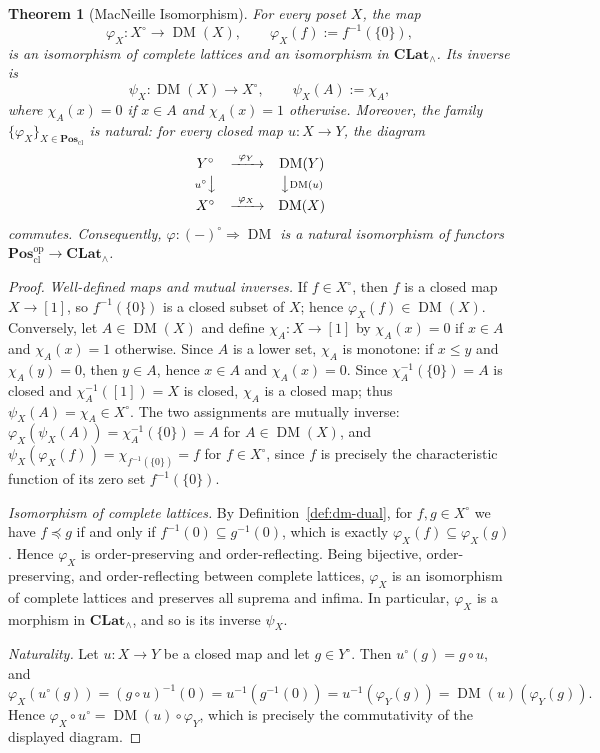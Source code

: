 \documentclass{amsart}
\theoremstyle{plain}
\newtheorem{theorem}{Theorem}[section]
\theoremstyle{definition}
\theoremstyle{remark}
\DeclareMathOperator{\DM}{DM}
\begin{document}
\begin{theorem}[MacNeille Isomorphism]\label{thm:macneille-iso}
For every poset $X$, the map
\[
\varphi_X\colon X^\circ\longrightarrow\DM(X),\qquad \varphi_X(f):=f^{-1}(\{0\}),
\]
is an isomorphism of complete lattices and an isomorphism in $\mathbf{CLat}_\wedge$. Its inverse is
\[
\psi_X\colon\DM(X)\longrightarrow X^\circ,\qquad \psi_X(A):=\chi_A,
\]
where $\chi_A(x)=0$ if $x\in A$ and $\chi_A(x)=1$ otherwise. Moreover, the family $\{\varphi_X\}_{X\in\mathbf{Pos}_{\mathrm{cl}}}$ is natural: for every closed map $u\colon X\to Y$, the diagram
\[
\begin{array}{ccc}
Y^\circ & \xrightarrow{\ \varphi_Y\ } & \DM(Y)\\[2pt]
{\scriptstyle u^\circ}\big\downarrow & & \big\downarrow{\scriptstyle \DM(u)}\\[2pt]
X^\circ & \xrightarrow{\ \varphi_X\ } & \DM(X)
\end{array}
\]
commutes. Consequently, $\varphi\colon(-)^\circ\Rightarrow\DM$ is a natural isomorphism of functors $\mathbf{Pos}_{\mathrm{cl}}^{\mathrm{op}}\to\mathbf{CLat}_\wedge$.
\end{theorem}

\begin{proof}
\emph{Well-defined maps and mutual inverses.} If $f\in X^\circ$, then $f$ is a closed map $X\to[1]$, so $f^{-1}(\{0\})$ is a closed subset of $X$; hence $\varphi_X(f)\in\DM(X)$. Conversely, let $A\in\DM(X)$ and define $\chi_A\colon X\to[1]$ by $\chi_A(x)=0$ if $x\in A$ and $\chi_A(x)=1$ otherwise. Since $A$ is a lower set, $\chi_A$ is monotone: if $x\leq y$ and $\chi_A(y)=0$, then $y\in A$, hence $x\in A$ and $\chi_A(x)=0$. Since $\chi_A^{-1}(\{0\})=A$ is closed and $\chi_A^{-1}([1])=X$ is closed, $\chi_A$ is a closed map; thus $\psi_X(A)=\chi_A\in X^\circ$. The two assignments are mutually inverse: $\varphi_X(\psi_X(A))=\chi_A^{-1}(\{0\})=A$ for $A\in\DM(X)$, and $\psi_X(\varphi_X(f))=\chi_{f^{-1}(\{0\})}=f$ for $f\in X^\circ$, since $f$ is precisely the characteristic function of its zero set $f^{-1}(\{0\})$.

\emph{Isomorphism of complete lattices.} By Definition~\ref{def:dm-dual}, for $f,g\in X^\circ$ we have $f\preceq g$ if and only if $f^{-1}(0)\subseteq g^{-1}(0)$, which is exactly $\varphi_X(f)\subseteq\varphi_X(g)$. Hence $\varphi_X$ is order-preserving and order-reflecting. Being bijective, order-preserving, and order-reflecting between complete lattices, $\varphi_X$ is an isomorphism of complete lattices and preserves all suprema and infima. In particular, $\varphi_X$ is a morphism in $\mathbf{CLat}_\wedge$, and so is its inverse $\psi_X$.

\emph{Naturality.} Let $u\colon X\to Y$ be a closed map and let $g\in Y^\circ$. Then $u^\circ(g)=g\circ u$, and
\[
\varphi_X(u^\circ(g))
=(g\circ u)^{-1}(0)
=u^{-1}(g^{-1}(0))
=u^{-1}(\varphi_Y(g))
=\DM(u)(\varphi_Y(g)).
\]
Hence $\varphi_X\circ u^\circ=\DM(u)\circ\varphi_Y$, which is precisely the commutativity of the displayed diagram.
\end{proof}
\end{document}
